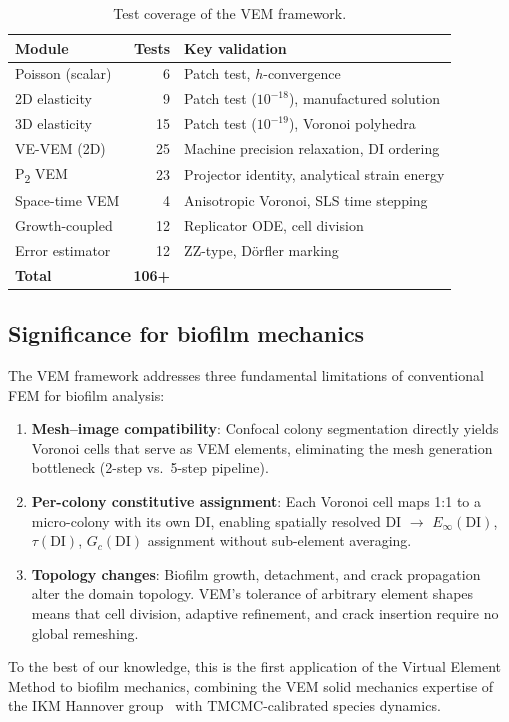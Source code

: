 \begin{table}[h]
\centering
\caption{Test coverage of the VEM framework.}
\label{tab:vem_tests}
\begin{tabular}{lrl}
\toprule
Module & Tests & Key validation \\
\midrule
Poisson (scalar) & 6 & Patch test, $h$-convergence \\
2D elasticity & 9 & Patch test ($10^{-18}$), manufactured solution \\
3D elasticity & 15 & Patch test ($10^{-19}$), Voronoi polyhedra \\
VE-VEM (2D) & 25 & Machine precision relaxation, DI ordering \\
P\textsubscript{2} VEM & 23 & Projector identity, analytical strain energy \\
Space-time VEM & 4 & Anisotropic Voronoi, SLS time stepping \\
Growth-coupled & 12 & Replicator ODE, cell division \\
Error estimator & 12 & ZZ-type, Dörfler marking \\
\midrule
\textbf{Total} & \textbf{106+} & \\
\bottomrule
\end{tabular}
\end{table}

\subsection{Significance for biofilm mechanics}
\label{sec:vem:significance}

The VEM framework addresses three fundamental limitations of conventional
FEM for biofilm analysis:

\begin{enumerate}
  \item \textbf{Mesh--image compatibility}: Confocal colony segmentation
    directly yields Voronoi cells that serve as VEM elements, eliminating
    the mesh generation bottleneck (2-step vs.\ 5-step pipeline).
  \item \textbf{Per-colony constitutive assignment}: Each Voronoi cell
    maps 1:1 to a micro-colony with its own DI, enabling spatially resolved
    DI $\to$ $E_\infty(\mathrm{DI})$, $\tau(\mathrm{DI})$, $G_c(\mathrm{DI})$
    assignment without sub-element averaging.
  \item \textbf{Topology changes}: Biofilm growth, detachment, and crack
    propagation alter the domain topology.  VEM's tolerance of arbitrary
    element shapes means that cell division, adaptive refinement, and
    crack insertion require no global remeshing.
\end{enumerate}

To the best of our knowledge, this is the first application of the
Virtual Element Method to biofilm mechanics, combining the VEM solid
mechanics expertise of the IKM Hannover group~\cite{Wriggers2019,
Wriggers2024,Aldakheel2018} with TMCMC-calibrated species dynamics.
